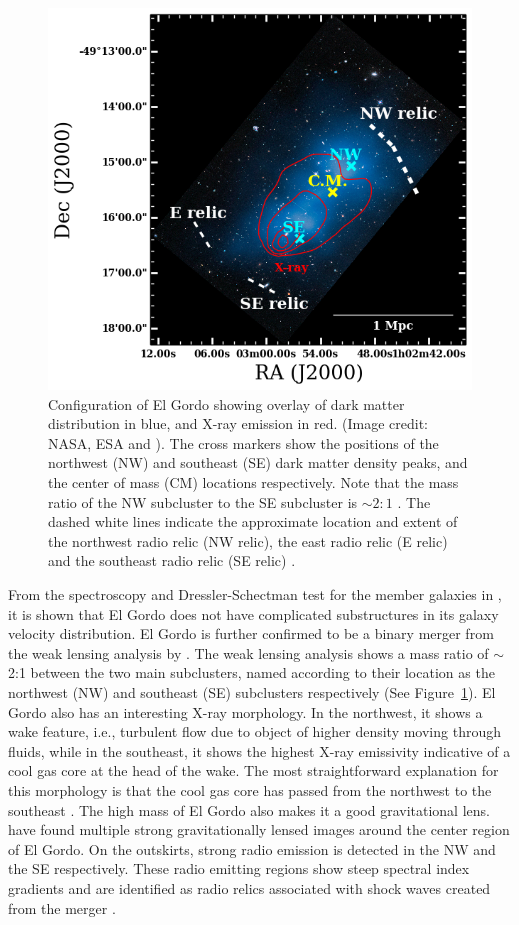 \documentclass[letterpaper,useAMS,usenatbib]{mn2e}
\begin{document}
\begin{figure}
	\includegraphics[width=1\textwidth]{ElGordo.png}
	\caption{Configuration of El Gordo showing overlay of dark
		matter distribution in blue, and X-ray emission in red. 
		(Image credit: NASA, ESA and \citealt{Jee13}). 
		The cross markers show the positions of the northwest (NW) and
		southeast (SE) dark matter density peaks, and the center of mass (CM)
		locations respectively. Note that the mass ratio of the NW subcluster
		to the SE subcluster is $\sim 2:1$ \citep{Jee13}. 
		The dashed white lines indicate the approximate location and extent of the northwest radio relic (NW relic), the east radio relic (E relic) and the
		southeast radio relic (SE relic) \citep{L13}.
		\label{fig:config}
	}
\end{figure}


From the spectroscopy and Dressler-Schectman test for the member galaxies
in \cite{Sifon13}, it is shown that El Gordo does not have complicated
substructures in its galaxy velocity distribution. 
El Gordo is further confirmed to be a binary merger 
from the weak lensing analysis by \cite{Jee13}. The weak lensing analysis shows
a mass ratio of $\sim$2:1  between the two main subclusters, named
according to their location as the northwest (NW) and southeast (SE) subclusters respectively 
(See Figure~\ref{fig:config}). 
El Gordo also has an interesting X-ray morphology. In the northwest, it shows a wake feature, i.e.,
turbulent flow due to object of higher density moving through fluids, while
in the southeast, it shows the highest X-ray emissivity indicative of a
cool gas core at the head of the wake. The most straightforward explanation for this morphology is that the
cool gas core has passed from the northwest to the southeast
\citep{M12}. 
The high mass of El Gordo also makes it a good
gravitational lens. \cite{Zitrin13} have found multiple strong
gravitationally lensed images around the center region of El Gordo. 
On the outskirts, strong radio emission is detected in
the NW and the SE respectively. These radio emitting regions show steep spectral
index gradients and are identified as radio relics associated with shock waves
created from the merger \citep{L13}. 
\end{document}
